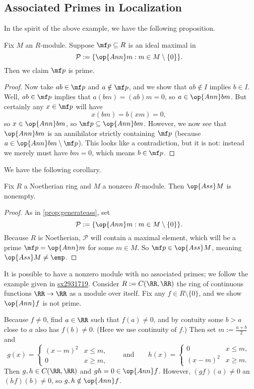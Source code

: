 \subsection{Associated Primes in Localization}
In the spirit of the above example, we have the following proposition.
\begin{proposition} \label{prop:generateass}
	Fix $M$ an $R$-module. Suppose $\mf p\subseteq R$ is an ideal maximal in
	\[\mathcal P:=\{\op{Ann}m:m\in M\setminus\{0\}\}.\]
	Then we claim $\mf p$ is prime.
\end{proposition}
\begin{proof}
	Now take $ab\in\mf p$ and $a\notin\mf p$, and we show that $ab\notin I$ implies $b\in I$. Well, $ab\in\mf p$ implies that $a(bm)=(ab)m=0$, so $a\in\op{Ann}bm$. But certainly any $x\in\mf p$ will have
	\[x(bm)=b(xm)=0,\]
	so $x\in\op{Ann}bm$, so $\mf p\subseteq\op{Ann}bm$. However, we now see that $\op{Ann}bm$ is an annihilator strictly containing $\mf p$ (because $a\in\op{Ann}bm\setminus\mf p$). This looks like a contradiction, but it is not: instead we merely must have $bm=0$, which means $b\in\mf p$.
\end{proof}
We have the following corollary.
\begin{corollary} \label{cor:hasass}
	Fix $R$ a Noetherian ring and $M$ a nonzero $R$-module. Then $\op{Ass}M$ is nonempty.
\end{corollary}
\begin{proof}
	As in \autoref{prop:generateass}, set
	\[\mathcal P:=\{\op{Ann}m:m\in M\setminus\{0\}\}.\]
	Because $R$ is Noetherian, $\mathcal P$ will contain a maximal element, which will be a prime $\mf p=\op{Ann}m$ for some $m\in M$. So $\mf p\in\op{Ass}M$, meaning $\op{Ass}M\ne\emp$.
\end{proof}
\begin{remark}[Nir]
	It is possible to have a nonzero module with no associated primes; we follow the example given in \href{https://math.stackexchange.com/a/3365952/869257}{sx2931719}. Consider $R:=C(\RR,\RR)$ the ring of continuous functions $\RR\to\RR$ as a module over itself. Fix any $f\in R\setminus\{0\}$, and we show $\op{Ann}f$ is not prime.

	Because $f\ne0$, find $a\in\RR$ such that $f(a)\ne0$, and by contuity some $b>a$ close to $a$ also has $f(b)\ne0$. (Here we use continuity of $f$.) Then set $m:=\frac{a+b}2$ and
	\[g(x)=\begin{cases}
		(x-m)^2 & x \le m, \\
		0 & x \ge m,
	\end{cases}\qquad\text{and}\qquad h(x)=\begin{cases}
		0 & x \le m, \\
		(x-m)^2 & x \ge m.
	\end{cases}\]
	Then $g,h\in C(\RR,\RR)$ and $gh=0\in\op{Ann}f$. However, $(gf)(a)\ne0$ an $(hf)(b)\ne0$, so $g,h\notin\op{Ann}f$.
\end{remark}


